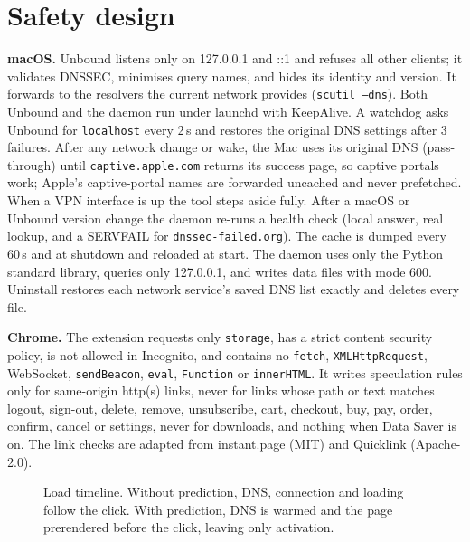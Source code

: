 \documentclass[11pt]{article}
\begin{document}
\section{Safety design}
\textbf{macOS.} Unbound listens only on 127.0.0.1 and ::1 and refuses all other clients; it validates DNSSEC, minimises query names, and hides its identity and version. It forwards to the resolvers the current network provides (\texttt{scutil --dns}). Both Unbound and the daemon run under launchd with KeepAlive. A watchdog asks Unbound for \texttt{localhost} every 2\,s and restores the original DNS settings after 3 failures. After any network change or wake, the Mac uses its original DNS (pass-through) until \texttt{captive.apple.com} returns its success page, so captive portals work; Apple's captive-portal names are forwarded uncached and never prefetched. When a VPN interface is up the tool steps aside fully. After a macOS or Unbound version change the daemon re-runs a health check (local answer, real lookup, and a SERVFAIL for \texttt{dnssec-failed.org}). The cache is dumped every 60\,s and at shutdown and reloaded at start. The daemon uses only the Python standard library, queries only 127.0.0.1, and writes data files with mode 600. Uninstall restores each network service's saved DNS list exactly and deletes every file.

\textbf{Chrome.} The extension requests only \texttt{storage}, has a strict content security policy, is not allowed in Incognito, and contains no \texttt{fetch}, \texttt{XMLHttpRequest}, WebSocket, \texttt{sendBeacon}, \texttt{eval}, \texttt{Function} or \texttt{innerHTML}. It writes speculation rules only for same-origin http(s) links, never for links whose path or text matches logout, sign-out, delete, remove, unsubscribe, cart, checkout, buy, pay, order, confirm, cancel or settings, never for downloads, and nothing when Data Saver is on. The link checks are adapted from instant.page (MIT) and Quicklink (Apache-2.0).

\begin{figure}[t]
\centering
\timelinediagram
\caption{Load timeline. Without prediction, DNS, connection and loading follow the click. With prediction, DNS is warmed and the page prerendered before the click, leaving only activation.}
\label{fig:timeline}
\end{figure}




\end{document}
